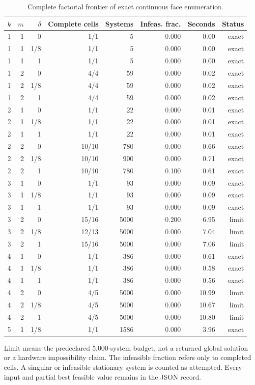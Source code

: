 \begin{table}[p]\centering\small
\caption{Complete factorial frontier of exact continuous face enumeration.}\label{tab:r43-face}
\begin{tabular}{rrrrrrrr}\toprule
$k$ & $m$ & $\delta$ & Complete cells & Systems & Infeas. frac. & Seconds & Status\\\midrule
1 & 1 & 0 & 1/1 & 5 & 0.000 & 0.00 & exact \\
1 & 1 & 1/8 & 1/1 & 5 & 0.000 & 0.00 & exact \\
1 & 1 & 1 & 1/1 & 5 & 0.000 & 0.00 & exact \\
1 & 2 & 0 & 4/4 & 59 & 0.000 & 0.02 & exact \\
1 & 2 & 1/8 & 4/4 & 59 & 0.000 & 0.02 & exact \\
1 & 2 & 1 & 4/4 & 59 & 0.000 & 0.02 & exact \\
2 & 1 & 0 & 1/1 & 22 & 0.000 & 0.01 & exact \\
2 & 1 & 1/8 & 1/1 & 22 & 0.000 & 0.01 & exact \\
2 & 1 & 1 & 1/1 & 22 & 0.000 & 0.01 & exact \\
2 & 2 & 0 & 10/10 & 780 & 0.000 & 0.66 & exact \\
2 & 2 & 1/8 & 10/10 & 900 & 0.000 & 0.71 & exact \\
2 & 2 & 1 & 10/10 & 780 & 0.100 & 0.61 & exact \\
3 & 1 & 0 & 1/1 & 93 & 0.000 & 0.09 & exact \\
3 & 1 & 1/8 & 1/1 & 93 & 0.000 & 0.09 & exact \\
3 & 1 & 1 & 1/1 & 93 & 0.000 & 0.09 & exact \\
3 & 2 & 0 & 15/16 & 5000 & 0.200 & 6.95 & limit \\
3 & 2 & 1/8 & 12/13 & 5000 & 0.000 & 7.04 & limit \\
3 & 2 & 1 & 15/16 & 5000 & 0.000 & 7.06 & limit \\
4 & 1 & 0 & 1/1 & 386 & 0.000 & 0.61 & exact \\
4 & 1 & 1/8 & 1/1 & 386 & 0.000 & 0.58 & exact \\
4 & 1 & 1 & 1/1 & 386 & 0.000 & 0.56 & exact \\
4 & 2 & 0 & 4/5 & 5000 & 0.000 & 10.99 & limit \\
4 & 2 & 1/8 & 4/5 & 5000 & 0.000 & 10.67 & limit \\
4 & 2 & 1 & 4/5 & 5000 & 0.000 & 10.80 & limit \\
5 & 1 & 1/8 & 1/1 & 1586 & 0.000 & 3.96 & exact \\
\bottomrule\end{tabular}
\par\smallskip\begin{minipage}{\textwidth}\small
Limit means the predeclared 5,000-system budget, not a returned global solution or a hardware impossibility claim. The infeasible fraction refers only to completed cells. A singular or infeasible stationary system is counted as attempted. Every input and partial best feasible value remains in the JSON record.
\end{minipage}\end{table}

